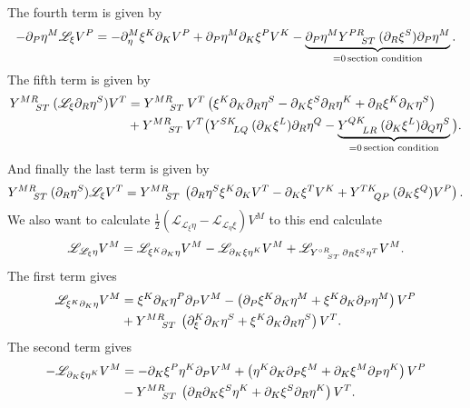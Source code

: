 The fourth term is given by 
\begin{equation}
    -\pd_P\eta^M\mathscr{L}_\xi V^P = -\pd_\eta^M\xi^K\pd_KV^P+\pd_P\eta^M\pd_K\xi^PV^K-\underbrace{\pd_P\eta^M\tensor{Y}{^{PR}_{ST}}(\pd_R\xi^S)\pd_P\eta^M}_{=0\, \text{section condition}}.
\end{equation}
The fifth term is given by 
\begin{equation}
    \begin{aligned}
        \tensor{Y}{^{MR}_{ST}}(\mathscr{L}_\xi \pd_R\eta^S)V^T &= \tensor{Y}{^{MR}_{ST}}V^T\left(\xi^K\pd_K\pd_R\eta^S-\pd_K\xi^S\pd_R\eta^K+\pd_R\xi^K\pd_K\eta^S\right)\\
        &+\tensor{Y}{^{MR}_{ST}}V^T\big(\tensor{Y}{^{SK}_{LQ}}(\pd_K\xi^L)\pd_R\eta^Q-\underbrace{\tensor{Y}{^{QK}_{LR}}(\pd_K\xi^L)\pd_Q\eta^S}_{=0\, \text{section condition}}\big).
    \end{aligned}
\end{equation}
And finally the last term is given by 
\begin{equation}
    \begin{aligned}
        \tensor{Y}{^{MR}_{ST}}(\pd_R\eta^S)\mathscr{L}_\xi V^T = \tensor{Y}{^{MR}_{ST}}\left(\pd_R\eta^S\xi^K\pd_KV^T-\pd_K\xi^TV^K+\tensor{Y}{^{TK}_{QP}}(\pd_K\xi^Q)V^P\right).
    \end{aligned}
\end{equation}
We also want to calculate $\frac{1}{2}(\mathscr{L}_{\mathscr{L}_\xi\eta}-\mathscr{L}_{\mathscr{L}_\eta\xi})V^M$ to this end calculate
\begin{equation}
    \mathscr{L}_{\mathscr{L}_\xi \eta}V^M = \mathscr{L}_{\xi^K\pd_K\eta}V^M-\mathscr{L}_{\pd_K\xi\eta^K}V^M+\mathscr{L}_{\tensor{Y}{^{\circ R}_{ST}}\pd_R\xi^S\eta^T}V^M.
\end{equation}
The first term gives 
\begin{equation}
    \begin{aligned}
        \mathscr{L}_{\xi^K\pd_K\eta}V^M &= \xi^K\pd_K\eta^P\pd_PV^M-\left(\pd_P\xi^K\pd_K\eta^M+\xi^K\pd_K\pd_P\eta^M\right)V^P\\
        &+\tensor{Y}{^{MR}_{ST}}\left(\pd_\xi^K\pd_K\eta^S+\xi^K\pd_K\pd_R\eta^S\right)V^T.
    \end{aligned}
\end{equation}
The second term gives 
\begin{equation}
    \begin{aligned}
        -\mathscr{L}_{\pd_K\xi\eta^K}V^M &= -\pd_K\xi^P\eta^K\pd_PV^M+\left(\eta^K\pd_K\pd_P\xi^M+\pd_K\xi^M\pd_P\eta^K\right)V^P\\
        &-\tensor{Y}{^{MR}_{ST}}\left(\pd_R\pd_K\xi^S\eta^K+\pd_K\xi^S\pd_R\eta^K\right)V^T.
    \end{aligned}
\end{equation}
